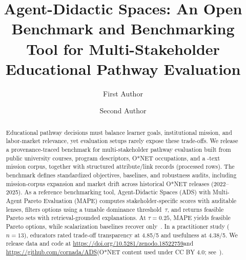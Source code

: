 \documentclass[sigconf,review]{acmart}
\title{Agent-Didactic Spaces: An Open Benchmark and Benchmarking Tool for Multi-Stakeholder Educational Pathway Evaluation}
\author{First Author}
\affiliation{%
  \institution{Institution}
  \city{City}
  \country{Country}
}
\author{Second Author}
\affiliation{%
  \institution{Institution}
  \city{City}
  \country{Country}
}
\newcommand{\BenchmarkURL}{\url{https://doi.org/10.5281/zenodo.18522759}}
\newcommand{\CodeURL}{\url{https://github.com/cornada/ADS}}
\newcommand{\ADS}{\textsc{ADS}\xspace}
\newcommand{\MAPE}{\textsc{MAPE}\xspace}
\newcommand{\IndustryPartner}{\textit{industry partner (anonymized)}}
\begin{document}
\begin{abstract}
Educational pathway decisions must balance learner goals, institutional mission, and labor-market relevance, yet evaluation setups rarely expose these trade-offs.
We release a provenance-traced benchmark for multi-stakeholder pathway evaluation built from \NumCourses public university courses, \NumPrograms program descriptors, \NumOccupations O*NET occupations, and a \NumMissionsExpanded-text mission corpus, together with \NumAttributeRecords structured attribute/link records (\NumProcessedRows processed rows).
The benchmark defines standardized objectives, baselines, and robustness audits, including mission-corpus expansion and market drift across historical O*NET releases (2022--2025).
As a reference benchmarking tool, Agent-Didactic Spaces (\ADS) with Multi-Agent Pareto Evaluation (\MAPE) computes stakeholder-specific scores with auditable lenses, filters options using a tunable dominance threshold~$\tau$, and returns feasible Pareto sets with retrieval-grounded explanations.
At $\tau{=}0.25$, \MAPE yields \MainParetoSize feasible Pareto options, while scalarization baselines recover only~{\BaselineOptima}.
In a practitioner study ($n{=}13$), educators rated trade-off transparency at {4.85/5} and usefulness at {4.38/5}.
We release data and code at \BenchmarkURL and \CodeURL (O*NET content used under CC BY 4.0; see~\cite{onet_license_db}).
\end{abstract}


\maketitle


\end{document}

